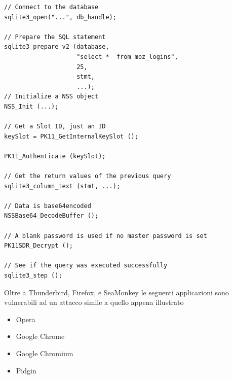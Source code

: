 \documentclass[12pt,oneside]{fithesis2}
\begin{document}
        \begin{verbatim}
// Connect to the database
sqlite3_open("...", db_handle);

// Prepare the SQL statement
sqlite3_prepare_v2 (database, 
                    "select *  from moz_logins", 
                    25, 
                    stmt,
                    ...);
// Initialize a NSS object
NSS_Init (...);

// Get a Slot ID, just an ID
keySlot = PK11_GetInternalKeySlot ();

PK11_Authenticate (keySlot);

// Get the return values of the previous query
sqlite3_column_text (stmt, ...);

// Data is base64encoded
NSSBase64_DecodeBuffer ();

// A blank password is used if no master password is set
PK11SDR_Decrypt ();

// See if the query was executed successfully
sqlite3_step ();
        \end{verbatim}
        
Oltre a Thunderbird, Firefox, e SeaMonkey le seguenti applicazioni sono vulnerabili ad un attacco simile a quello appena illustrato
\begin{itemize}
    \item Opera
    \item Google Chrome
    \item Google Chromium
    \item Pidgin
\end{itemize}
        
        
        \clearpage
        
\end{document}
